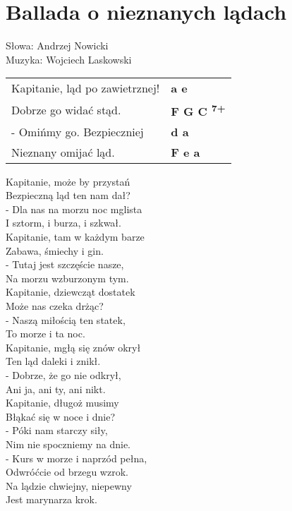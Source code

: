 \section{Ballada o nieznanych lądach}

Słowa: Andrzej Nowicki\\
Muzyka: Wojciech Laskowski

\vspace{2em}
\begin{tabular}{@{}p{7cm}@{}l@{}}
Kapitanie, ląd po zawietrznej! & \bfseries a e\\
Dobrze go widać stąd. & \bfseries F G C \textsuperscript{7+} \\
- Omińmy go. Bezpieczniej & \bfseries d a\\
Nieznany omijać ląd. & \bfseries F e a\\
\end{tabular}

\vspace{1em}
Kapitanie, może by przystań \\
Bezpieczną ląd ten nam dał? \\
- Dla nas na morzu noc mglista \\
I sztorm, i burza, i szkwał. \\

Kapitanie, tam w każdym barze \\
Zabawa, śmiechy i gin. \\
- Tutaj jest szczęście nasze, \\
Na morzu wzburzonym tym. \\

Kapitanie, dziewcząt dostatek \\
Może nas czeka drżąc? \\
- Naszą miłością ten statek, \\
To morze i ta noc. \\

Kapitanie, mgłą się znów okrył \\
Ten ląd daleki i znikł. \\
- Dobrze, że go nie odkrył, \\
Ani ja, ani ty, ani nikt. \\

Kapitanie, długoż musimy \\
Błąkać się w noce i dnie? \\
- Póki nam starczy siły, \\
Nim nie spoczniemy na dnie. \\

- Kurs w morze i naprzód pełna, \\
Odwróćcie od brzegu wzrok. \\
Na lądzie chwiejny, niepewny \\
Jest marynarza krok. \\